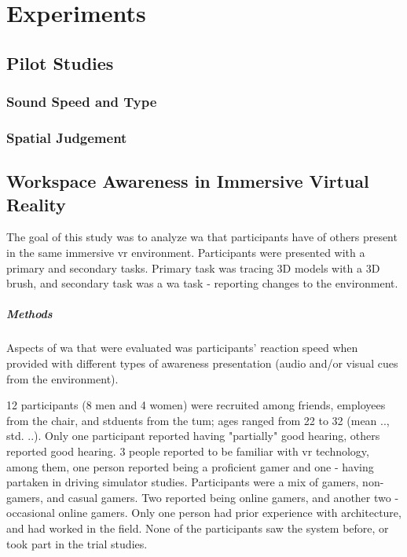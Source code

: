 
\chapter{Experiments}
\section{Pilot Studies}
\subsection{Sound Speed and Type}
\subsection{Spatial Judgement}
\section{Workspace Awareness in Immersive Virtual Reality}
The goal of this study was to analyze \gls{wa} that participants have of others present in the same immersive \gls{vr} environment. Participants were presented with a primary and secondary tasks. Primary task was tracing 3D models with a 3D brush, and secondary task was a \gls{wa} task - reporting changes to the environment.

\paragraph{Methods}
Aspects of \gls{wa} that were evaluated was participants’ reaction speed when provided with different types of awareness presentation (audio and/or visual cues from the environment).

12 participants (8 men and 4 women) were recruited among friends, employees from the chair, and stduents from the \gls{tum}; ages ranged from 22 to 32 (mean .., std. ..). Only one participant reported having "partially" good hearing, others reported good hearing. 3 people reported to be familiar with \gls{vr} technology, among them, one person reported being a proficient gamer and one - having partaken in driving simulator studies. Participants were a mix of gamers, non-gamers, and casual gamers. Two reported being online gamers, and another two - occasional online gamers. Only one person had prior experience with architecture, and had worked in the field. None of the participants saw the system before, or took part in the trial studies.

